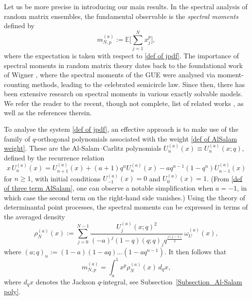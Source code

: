 \documentclass{amsart}
\theoremstyle{plain}
\theoremstyle{remark}
\numberwithin{equation}{section}
\begin{document}
Let us be more precise in introducing our main results. In the spectral analysis of random matrix ensembles, the fundamental observable is the \textit{spectral moments} defined by 
\begin{equation}
m_{N,p}^{ (a) }:= \mathbb{E} \Big[ \sum_{j=1}^N x_j^{p} \Big],
\end{equation}
where the expectation is taken with respect to \eqref{def of jpdf}. The importance of spectral moments in random matrix theory dates back to the foundational work of Wigner \cite{Wi55}, where the spectral moments of the GUE were analysed via moment-counting methods, leading to the celebrated semicircle law. Since then, there has been extensive research on spectral moments in various exactly solvable models. We refer the reader to the recent, though not complete, list of related works \cite{ABGS21a,CDO21,GGR21,CMOS19,RF21,BF24,By24b,ABO25}, as well as the references therein.

To analyse the system \eqref{def of jpdf}, an effective approach is to make use of the family of \( q \)-orthogonal polynomials associated with the weight \eqref{def of AlSalam weight}. These are the Al-Salam--Carlitz polynomials $U_n^{(a)}(x) \equiv U_n^{(a)}(x;q)$, defined by the recurrence relation
\begin{equation} \label{def of three term AlSalam}
x\,U_n^{(a)}(x) = U_{n+1}^{(a)}(x) +(a+1)q^n U_n^{(a)}(x) -a q^{n-1} (1-q^n)U_{n-1}^{(a)}(x)
\end{equation}
for $n \ge 1$, with initial conditions $U_{-1}^{(a)}(x)=0$ and $U_0^{(a)}(x)=1$. (From \eqref{def of three term AlSalam}, one can observe a notable simplification when \( a = -1 \), in which case the second term on the right-hand side vanishes.)
Using the theory of determinantal point processes, the spectral moments can be expressed in terms of the averaged density
\begin{equation} \label{def of 1pt density}
\rho_N^{(a)}(x) :=  \sum_{ j=0 }^{N-1} \frac{ U_{j}^{(a)}(x;q)^2  }{ (-a)^{j}(1-q)(q;q)_{j} q^{\frac{j(j-1)}{2}} }  \,\omega_U^{(a)}(x), 
\end{equation}
where  
$(a;q)_n  := (1-a)(1-aq) \dots (1-aq^{n-1})$. It then follows that 
\begin{equation} \label{def of moment in terms of q-integral}
m_{N,p}^{ (a) } =  \int_a^1 x^{p} \rho_N^{(a)}(x)\,d_q x, 
\end{equation}
where $d_q x$ denotes the Jackson $q$-integral, see Subsection~\ref{Subsection_Al-Salam poly}.  
\end{document}
